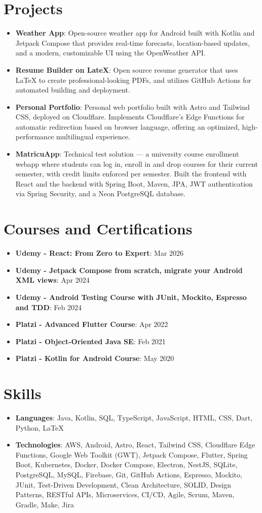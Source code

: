 \documentclass[letterpaper,11pt]{article}
\newcommand{\resumeItem}[2]{
  \item\small{
    \textbf{#1}{: #2 \vspace{-2pt}}
  }
}
\newcommand{\resumeSubItem}[2]{\resumeItem{#1}{#2}\vspace{-4pt}}
\newcommand{\resumeSubHeadingListStart}{\begin{itemize}[leftmargin=*]}
\newcommand{\resumeSubHeadingListEnd}{\end{itemize}}
\begin{document}
\section{Projects}
\resumeSubHeadingListStart
\resumeSubItem{Weather App}
{Open-source weather app for Android built with Kotlin and Jetpack Compose that provides real-time forecasts, location-based updates, and a modern, customizable UI using the OpenWeather API.}
\resumeSubItem{Resume Builder on LateX}
{Open source resume generator that uses LaTeX to create professional-looking PDFs, and utilizes GitHub Actions for automated building and deployment.}
\resumeSubItem{Personal Portfolio}
{Personal web portfolio built with Astro and Tailwind CSS, deployed on Cloudflare. Implements Cloudflare's Edge Functions for automatic redirection based on browser language, offering an optimized, high-performance multilingual experience.}
\resumeSubItem{MatricuApp}
{Technical test solution — a university course enrollment webapp where students can log in, enroll in and drop courses for their current semester, with credit limits enforced per semester. Built the frontend with React and the backend with Spring Boot, Maven, JPA, JWT authentication via Spring Security, and a Neon PostgreSQL database.}
\resumeSubHeadingListEnd

\section{Courses and Certifications}
\resumeSubHeadingListStart
\resumeSubItem{Udemy - React: From Zero to Expert}{Mar 2026}
\resumeSubItem{Udemy - Jetpack Compose from scratch, migrate your Android XML views}{Apr 2024}
\resumeSubItem{Udemy - Android Testing Course with JUnit, Mockito, Espresso and TDD}{Feb 2024}
\resumeSubItem{Platzi - Advanced Flutter Course}{Apr 2022}
\resumeSubItem{Platzi - Object-Oriented Java SE}{Feb 2021}
\resumeSubItem{Platzi - Kotlin for Android Course}{May 2020}
\resumeSubHeadingListEnd

\section{Skills}
\resumeSubHeadingListStart
\item{
            \textbf{Languages}{: Java, Kotlin, SQL, TypeScript, JavaScript, HTML, CSS, Dart, Python, LaTeX}

      }
\item {
            \textbf{Technologies}{: AWS, Android, Astro, React, Tailwind CSS, Cloudflare Edge Functions, Google Web Toolkit (GWT), Jetpack Compose, Flutter, Spring Boot, Kubernetes, Docker, Docker Compose, Electron, NestJS, SQLite, PostgreSQL, MySQL, Firebase, Git, GitHub Actions, Espresso, Mockito, JUnit, Test-Driven Development, Clean Architecture, SOLID, Design Patterns, RESTful APIs, Microservices, CI/CD, Agile, Scrum, Maven, Gradle, Make, Jira}
      }
\resumeSubHeadingListEnd


\end{document}
